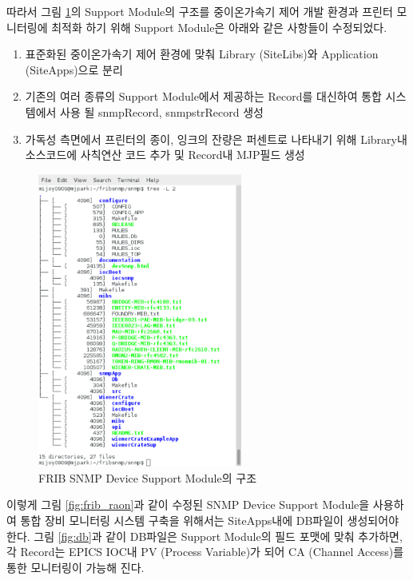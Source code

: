 \documentclass[11pt
  , a4paper
  , article
  , oneside
]{memoir}
\begin{document}
따라서 그림 \ref{fig:fribtree}의 Support Module의 구조를 중이온가속기 제어 개발 환경과 프린터 모니터링에 최적화 하기 위해 Support Module은 아래와 같은 사항들이 수정되었다.  

\begin{enumerate}
\item 표준화된 중이온가속기 제어 환경에 맞춰 Library (SiteLibs)와 Application (SiteApps)으로 분리
\item 기존의 여러 종류의 Support Module에서 제공하는 Record를 대신하여 통합 시스템에서 사용 될 snmpRecord, snmpstrRecord 생성
\item 가독성 측면에서 프린터의 종이, 잉크의 잔량은 퍼센트로 나타내기 위해 Library내 소스코드에 사칙연산 코드 추가 및 Record내 MJP필드 생성
\end{enumerate}

\begin{figure}[h!]
  \centering
  \includegraphics[width=0.6\textwidth]{./images/fribmoduletree.eps}
  \caption{FRIB SNMP Device Support Module의 구조}
  \label{fig:fribtree}  
\end{figure}

이렇게 그림 \ref{fig:frib_raon}과 같이 수정된 SNMP Device Support Module을 사용하여 통합 장비 모니터링 시스템 구축을 위해서는 SiteApps내에 DB파일이 생성되어야 한다. 그림 \ref{fig:db}과 같이 DB파일은 Support Module의 필드 포맷에 맞춰 추가하면, 각 Record는 EPICS IOC내 PV (Process Variable)가 되어 CA (Channel Access)를 통한 모니터링이 가능해 진다. 
\end{document}
